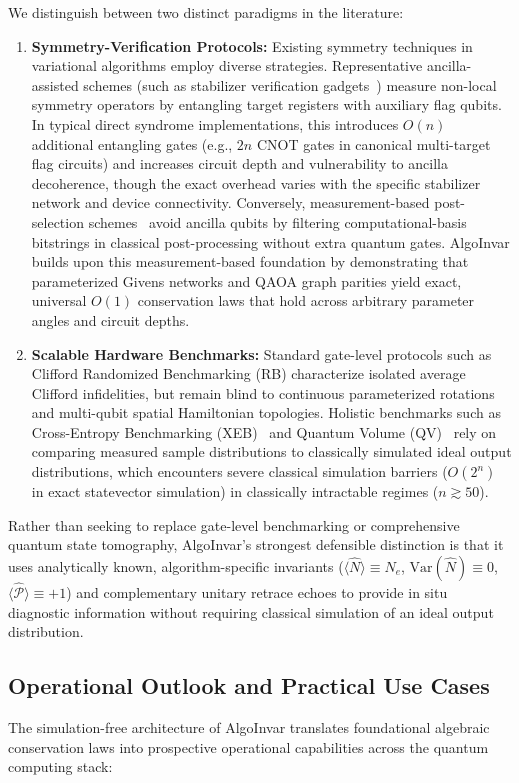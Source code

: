 \documentclass[aps,pra,reprint,superscriptaddress,floatfix,nofootinbib]{revtex4-2}
\begin{document}
We distinguish between two distinct paradigms in the literature:
\begin{enumerate}
    \item \textbf{Symmetry-Verification Protocols:} Existing symmetry techniques in variational algorithms employ diverse strategies. Representative ancilla-assisted schemes (such as stabilizer verification gadgets~\cite{McArdle2019, BonetMonroig2018}) measure non-local symmetry operators by entangling target registers with auxiliary flag qubits. In typical direct syndrome implementations, this introduces $O(n)$ additional entangling gates (e.g., $2n$ CNOT gates in canonical multi-target flag circuits) and increases circuit depth and vulnerability to ancilla decoherence, though the exact overhead varies with the specific stabilizer network and device connectivity. Conversely, measurement-based post-selection schemes~\cite{Sagastizabal2019} avoid ancilla qubits by filtering computational-basis bitstrings in classical post-processing without extra quantum gates. AlgoInvar builds upon this measurement-based foundation by demonstrating that parameterized Givens networks and QAOA graph parities yield exact, universal $O(1)$ conservation laws that hold across arbitrary parameter angles and circuit depths.
    \item \textbf{Scalable Hardware Benchmarks:} Standard gate-level protocols such as Clifford Randomized Benchmarking (RB) characterize isolated average Clifford infidelities, but remain blind to continuous parameterized rotations and multi-qubit spatial Hamiltonian topologies. Holistic benchmarks such as Cross-Entropy Benchmarking (XEB)~\cite{Boixo2018} and Quantum Volume (QV)~\cite{Cross2019} rely on comparing measured sample distributions to classically simulated ideal output distributions, which encounters severe classical simulation barriers ($O(2^n)$ in exact statevector simulation) in classically intractable regimes ($n \gtrsim 50$).
\end{enumerate}

Rather than seeking to replace gate-level benchmarking or comprehensive quantum state tomography, AlgoInvar's strongest defensible distinction is that it uses analytically known, algorithm-specific invariants ($\langle \hat{N} \rangle \equiv N_e$, $\text{Var}(\hat{N}) \equiv 0$, $\langle \hat{\mathcal{P}} \rangle \equiv +1$) and complementary unitary retrace echoes to provide in situ diagnostic information without requiring classical simulation of an ideal output distribution.

\subsection{Operational Outlook and Practical Use Cases}
The simulation-free architecture of AlgoInvar translates foundational algebraic conservation laws into prospective operational capabilities across the quantum computing stack:
\end{document}

